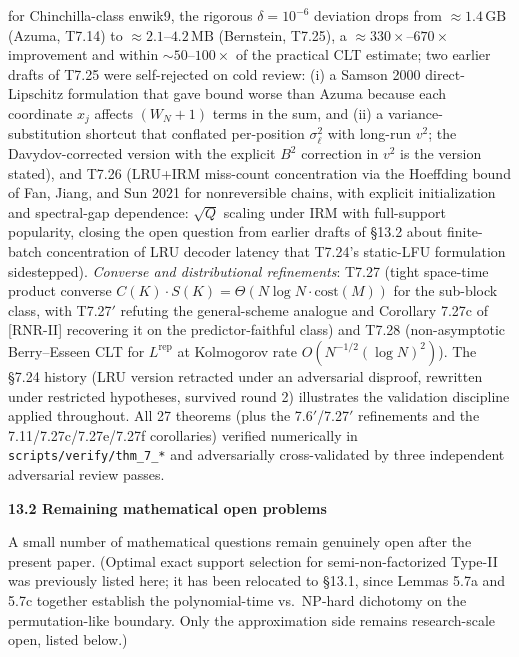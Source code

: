 \documentclass[
]{article}
\begin{document}
\begin{itemize}
  for Chinchilla-class enwik9, the rigorous $\delta = 10^{-6}$
  deviation drops from $\approx 1.4\,\mathrm{GB}$ (Azuma, T7.14) to
  $\approx 2.1$--$4.2\,\mathrm{MB}$ (Bernstein, T7.25), a
  $\approx 330\times$--$670\times$ improvement and within
  $\sim 50$--$100\times$ of the practical CLT estimate; two earlier drafts of T7.25 were
  self-rejected on cold review: (i) a Samson 2000 direct-Lipschitz
  formulation that gave bound worse than Azuma because each
  coordinate $x_j$ affects $(W_N+1)$ terms in the sum, and (ii) a
  variance-substitution shortcut that conflated per-position
  $\sigma_\ell^2$ with long-run $v^2$; the Davydov-corrected version
  with the explicit $B^2$ correction in $v^2$ is the version stated),
  and T7.26 (LRU+IRM miss-count concentration via the
  Hoeffding bound of Fan, Jiang, and Sun 2021 for nonreversible
  chains, with explicit initialization and spectral-gap dependence:
  $\sqrt{Q}$ scaling under IRM with full-support popularity, closing the open question from earlier drafts of §13.2
  about finite-batch concentration of LRU decoder latency that
  T7.24's static-LFU formulation sidestepped). \emph{Converse and
  distributional refinements}: T7.27 (tight space-time product
  converse $C(K)\cdot S(K)=\Theta(N\log N\cdot\mathrm{cost}(M))$ for
  the sub-block class, with T7.27$'$ refuting the general-scheme
  analogue and Corollary 7.27c of [RNR-II] recovering it on the predictor-faithful
  class) and T7.28 (non-asymptotic Berry--Esseen CLT for
  $L^{\mathrm{rep}}$ at Kolmogorov rate $O(N^{-1/2}(\log N)^2)$).
  The §7.24 history
  (LRU version retracted under an adversarial disproof, rewritten under
  restricted hypotheses, survived round 2) illustrates the
  validation discipline applied throughout.
  All 27 theorems (plus the 7.6$'$/7.27$'$ refinements and the
  7.11/7.27c/7.27e/7.27f corollaries) verified numerically in
  \texttt{scripts/verify/thm\_7\_*} and adversarially
  cross-validated by three independent adversarial review passes.
\end{itemize}

\textbf{13.2 Remaining mathematical open problems}

A small number of mathematical questions remain genuinely open after
the present paper. (Optimal exact support selection for
semi-non-factorized Type-II was previously listed here; it has been
relocated to §13.1, since Lemmas 5.7a and 5.7c together establish
the polynomial-time vs.\ NP-hard dichotomy on the permutation-like
boundary. Only the approximation side remains research-scale open,
listed below.)
\end{document}
